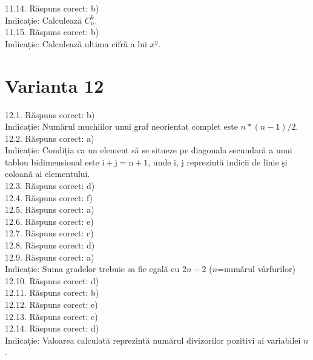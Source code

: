 11.14. Răspuns corect: b)\\
Indicație: Calculează $C_{n}^{k}$.\\

11.15. Răspuns corect: b)\\
Indicație: Calculează ultima cifră a lui $x^{y}$.\\

\section*{Varianta 12}

12.1. Răspuns corect: b)\\
Indicație: Numărul muchiilor unui graf neorientat complet este $n *(n-1) / 2$.\\

12.2. Răspuns corect: a)\\
Indicație: Condiția ca un element să se situeze pe diagonala secundară a unui tablou bidimensional este $\mathrm{i}+\mathrm{j}=\mathrm{n}+1$, unde $\mathrm{i}$, $\mathrm{j}$ reprezintă indicii de linie ș̦i coloană ai elementului.\\

12.3. Răspuns corect: d)\\

12.4. Răspuns corect: f)\\

12.5. Răspuns corect: a)\\

12.6. Răspuns corect: e)\\

12.7. Răspuns corect: c)\\

12.8. Răspuns corect: d)\\

12.9. Răspuns corect: a)\\
Indicație: Suma gradelor trebuie sa fie egală cu $2n-2$ ($n$=numărul vârfurilor)\\

12.10. Răspuns corect: d)\\

12.11. Răspuns corect: b)\\

12.12. Răspuns corect: e)\\

12.13. Răspuns corect: c)\\

12.14. Răspuns corect: d)\\
Indicație: Valoarea calculată reprezintă numărul divizorilor pozitivi ai variabilei $n$.\\

